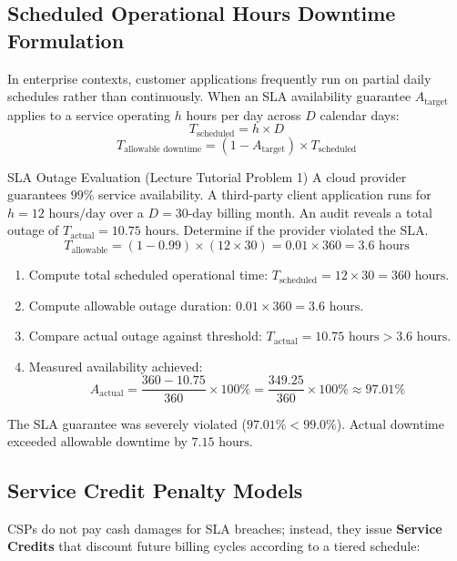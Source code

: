 \subsection{Scheduled Operational Hours Downtime Formulation}
In enterprise contexts, customer applications frequently run on partial daily schedules rather than continuously. When an SLA availability guarantee $A_{\text{target}}$ applies to a service operating $h$ hours per day across $D$ calendar days:
\begin{equation}
T_{\text{scheduled}} = h \times D
\end{equation}
\begin{equation}
T_{\text{allowable downtime}} = (1 - A_{\text{target}}) \times T_{\text{scheduled}}
\end{equation}

\begin{solved}{SLA Outage Evaluation (Lecture Tutorial Problem 1)}
\Given A cloud provider guarantees $99\%$ service availability. A third-party client application runs for $h = 12\text{ hours/day}$ over a $D = 30\text{-day}$ billing month. An audit reveals a total outage of $T_{\text{actual}} = 10.75\text{ hours}$. Determine if the provider violated the SLA.
\Formula
\begin{equation}
T_{\text{allowable}} = (1 - 0.99) \times (12 \times 30) = 0.01 \times 360 = 3.6\text{ hours}
\end{equation}
\Steps
\begin{enumerate}[leftmargin=*]
  \item Compute total scheduled operational time: $T_{\text{scheduled}} = 12 \times 30 = 360\text{ hours}$.
  \item Compute allowable outage duration: $0.01 \times 360 = 3.6\text{ hours}$.
  \item Compare actual outage against threshold: $T_{\text{actual}} = 10.75\text{ hours} > 3.6\text{ hours}$.
  \item Measured availability achieved:
  \begin{equation}
  A_{\text{actual}} = \frac{360 - 10.75}{360} \times 100\% = \frac{349.25}{360} \times 100\% \approx 97.01\%
  \end{equation}
\end{enumerate}
\Answer The SLA guarantee was severely violated ($97.01\% < 99.0\%$). Actual downtime exceeded allowable downtime by $7.15\text{ hours}$.
\end{solved}

\subsection{Service Credit Penalty Models}
CSPs do not pay cash damages for SLA breaches; instead, they issue \textbf{Service Credits} that discount future billing cycles according to a tiered schedule:

